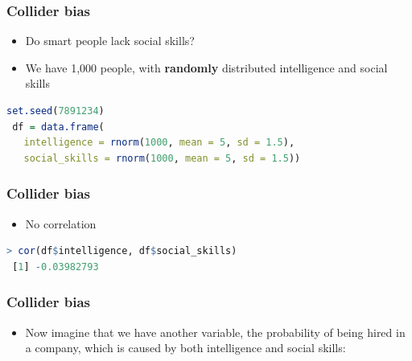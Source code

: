 \documentclass[aspectratio=43]{beamer}
\begin{document}
\begin{frame}[fragile]
\frametitle{Collider bias}
\centering

\begin{itemize}
  \item Do smart people lack social skills?
  \item We have 1,000 people, with \textbf{randomly} distributed intelligence and social skills
\end{itemize}

 \begin{lstlisting}[language=R]
 set.seed(7891234)
 df = data.frame(
   intelligence = rnorm(1000, mean = 5, sd = 1.5),
   social_skills = rnorm(1000, mean = 5, sd = 1.5))
 \end{lstlisting}

\end{frame}

\begin{frame}[fragile]
\frametitle{Collider bias}
\centering

\begin{itemize}
  \item No correlation
\end{itemize}

 \begin{lstlisting}[language=R]
 > cor(df$intelligence, df$social_skills)
 [1] -0.03982793
 \end{lstlisting}

\end{frame}

\begin{frame}
\frametitle{Collider bias}
\centering

\begin{itemize}
  \item Now imagine that we have another variable, the probability of being hired in a company, which is caused by both intelligence and social skills:
\end{itemize}


\end{frame}
\end{document}
